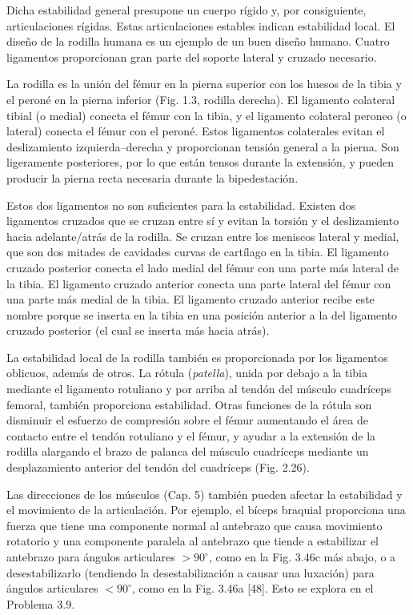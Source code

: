 \documentclass[12pt]{book}
\begin{document}
Dicha estabilidad general presupone un cuerpo rígido y, por consiguiente, articulaciones rígidas. Estas articulaciones estables indican estabilidad local. El diseño de la rodilla humana es un ejemplo de un buen diseño humano. Cuatro ligamentos proporcionan gran parte del soporte lateral y cruzado necesario.

La rodilla es la unión del fémur en la pierna superior con los huesos de la tibia y el peroné en la pierna inferior (Fig. 1.3, rodilla derecha). El ligamento colateral tibial (o medial) conecta el fémur con la tibia, y el ligamento colateral peroneo (o lateral) conecta el fémur con el peroné. Estos ligamentos colaterales evitan el deslizamiento izquierda--derecha y proporcionan tensión general a la pierna. Son ligeramente posteriores, por lo que están tensos durante la extensión, y pueden producir la pierna recta necesaria durante la bipedestación.

Estos dos ligamentos no son suficientes para la estabilidad. Existen dos ligamentos cruzados que se cruzan entre sí y evitan la torsión y el deslizamiento hacia adelante/atrás de la rodilla. Se cruzan entre los meniscos lateral y medial, que son dos mitades de cavidades curvas de cartílago en la tibia. El ligamento cruzado posterior conecta el lado medial del fémur con una parte más lateral de la tibia. El ligamento cruzado anterior conecta una parte lateral del fémur con una parte más medial de la tibia. El ligamento cruzado anterior recibe este nombre porque se inserta en la tibia en una posición anterior a la del ligamento cruzado posterior (el cual se inserta más hacia atrás).

La estabilidad local de la rodilla también es proporcionada por los ligamentos oblicuos, además de otros. La rótula (\textit{patella}), unida por debajo a la tibia mediante el ligamento rotuliano y por arriba al tendón del músculo cuadríceps femoral, también proporciona estabilidad. Otras funciones de la rótula son disminuir el esfuerzo de compresión sobre el fémur aumentando el área de contacto entre el tendón rotuliano y el fémur, y ayudar a la extensión de la rodilla alargando el brazo de palanca del músculo cuadríceps mediante un desplazamiento anterior del tendón del cuadríceps (Fig. 2.26).

Las direcciones de los músculos (Cap. 5) también pueden afectar la estabilidad y el movimiento de la articulación. Por ejemplo, el bíceps braquial proporciona una fuerza que tiene una componente normal al antebrazo que causa movimiento rotatorio y una componente paralela al antebrazo que tiende a estabilizar el antebrazo para ángulos articulares $>90^\circ$, como en la Fig. 3.46c más abajo, o a desestabilizarlo (tendiendo la desestabilización a causar una luxación) para ángulos articulares $<90^\circ$, como en la Fig. 3.46a [48]. Esto se explora en el Problema 3.9.
\end{document}
